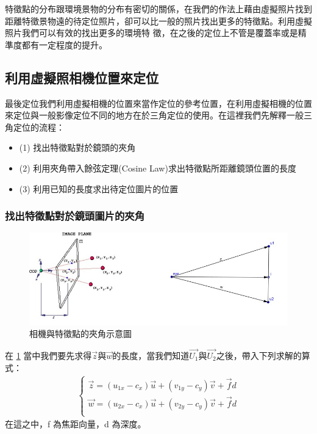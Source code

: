 	特徵點的分布跟環境景物的分布有密切的關係，在我們的作法上藉由虛擬照片找到距離特徵景物遠的待定位照片，卻可以比一般的照片找出更多的特徵點。利用虛擬照片我們可以有效的找出更多的環境特
	徵，在之後的定位上不管是覆蓋率或是精準度都有一定程度的提升。

\subsection{利用虛擬照相機位置來定位}

	最後定位我們利用虛擬相機的位置來當作定位的參考位置，在利用虛擬相機的位置來定位與一般影像定位不同的地方在於三角定位的使用。在這裡我們先解釋一般三角定位的流程：
	\begin{itemize}
			\item (1) 找出特徵點對於鏡頭的夾角
    		\item (2) 利用夾角帶入餘弦定理(Cosine Law)求出特徵點所距離鏡頭位置的長度
    		\item (3) 利用已知的長度求出待定位圖片的位置
	\end{itemize}
	
	\subsubsection{找出特徵點對於鏡頭圖片的夾角}
	
	\begin{figure}
	\begin{center}
	  \includegraphics[width=1.0\textwidth]{figures/Included_Angle.jpg}
	  \caption{相機與特徵點的夾角示意圖}
	  \label{fig:Included Angle}
	\end{center}
	\end{figure}
	
	在 \ref{fig:Included Angle} 當中我們要先求得$\vec{z}$與$\vec{w}$的長度，當我們知道$\vec{U_1}$與$\vec{U_2}$之後，帶入下列求解的算式：
	\begin{align}
		\left\{
		\begin{array}{cccc}
		\vec{z} = (u_{1x} - c_x)\vec{u} + (v_{1y} - c_y)\vec{v} + \vec{f}d\\
		\vec{w} = (u_{2x} - c_x)\vec{u} + (v_{2y} - c_y)\vec{v} + \vec{f}d\\
		\end{array}
		\right.
	\end{align}
	在這之中，f 為焦距向量，d 為深度。	
	
